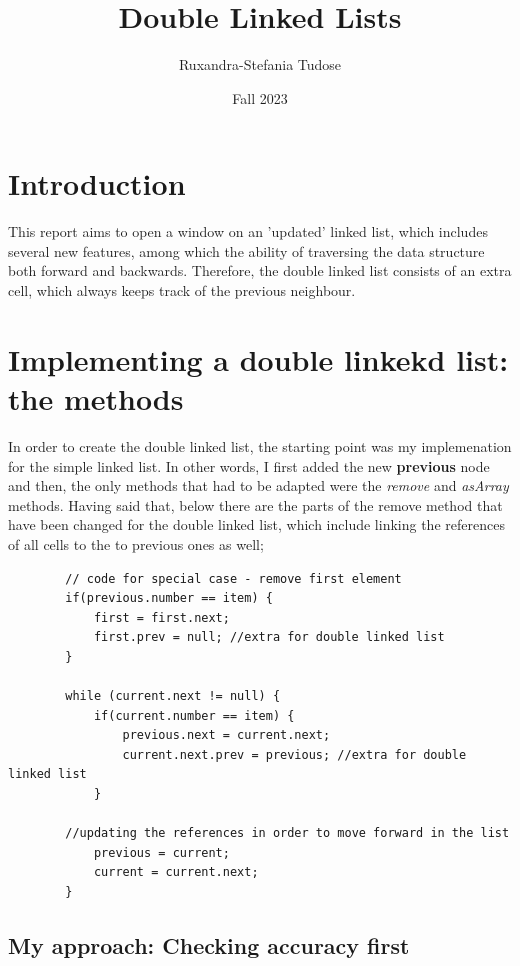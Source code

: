\documentclass[a4paper,11pt]{article}
\begin{document}
\title{
    \textbf{Double Linked Lists}
}
\author{Ruxandra-Stefania Tudose}
\date{Fall 2023}

\maketitle

\section*{Introduction}

This report aims to open a window on an 'updated' linked list, which includes several new features, among which the ability of
traversing the data structure both forward and backwards. 
Therefore, the double linked list consists of an extra cell, which always keeps track of the previous neighbour. 


\section*{Implementing a double linkekd list: the methods}

In order to create the double linked list, the starting point was my implemenation for the simple linked list.
In other words, I first added the new \textbf{previous} node and then,
the only methods that had to be adapted were the \textit{remove} and \textit{asArray} methods.
Having said that, below there are the parts of the remove method that have been changed for the double linked list, which 
include linking the references of all cells to the
to previous ones as well;

\begin{verbatim}
        // code for special case - remove first element
        if(previous.number == item) { 
            first = first.next;
            first.prev = null; //extra for double linked list
        }    
   
        while (current.next != null) {
            if(current.number == item) {
                previous.next = current.next;
                current.next.prev = previous; //extra for double linked list
            }

        //updating the references in order to move forward in the list
            previous = current;
            current = current.next;
        }
\end{verbatim}  


\subsection*{My approach: Checking accuracy first}
\end{document}
